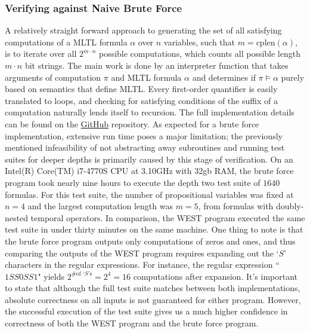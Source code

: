 \documentclass[runningheads]{llncs}
\begin{document}
\subsubsection{Verifying against Naive Brute Force}
 A relatively straight forward approach to generating the set of all satisfying computations of a MLTL formula $\alpha$ over $n$ variables, such that $m = \text{cplen}(\alpha)$, is to iterate over all $2^{m \cdot n}$ possible computations, which counts all possible length $m \cdot n$ bit strings. 
The main work is done by an interpreter function that takes arguments of computation $\pi$ and MLTL formula $\alpha$ and determines if $\pi \vDash \alpha$ purely based on semantics that define MLTL.
Every first-order quantifier is easily translated to loops, and checking for satisfying conditions of the suffix of a computation naturally lends itself to recursion.
The full implementation details can be found on the \href{https://github.com/zwang271/2022-Iowa-State-REU-Temporal-Logic-.git}{GitHub} repository. 
As expected for a brute force implementation, extensive run time poses a major limitation; the previously mentioned infeasibility of not abstracting away subroutines and running test suites for deeper depths is primarily caused by this stage of verification. 
On an Intel(R) Core(TM) i7-4770S CPU at 3.10GHz with 32gb RAM, the brute force program took nearly nine hours to execute the depth two test suite of $1640$ formulas. 
For this test suite, the number of propositional variables was fixed at $n = 4$ and the largest computation length was $m = 5$, from formulas with doubly-nested temporal operators. 
In comparison, the WEST program executed the same test suite in under thirty minutes on the same machine. One thing to note is that the brute force program outputs only computations of zeros and ones, and thus comparing the outputs of the WEST program requires expanding out the `$S$' characters in the regular expressions. For instance, the regular expression ``$1SS0SS1$" yields $2^{\text{\# of `$S$'s}} = 2^4 = 16$ computations after expansion.
It's important to state that although the full test suite matches between both implementations, absolute correctness on all inputs is not guaranteed for either program. However, the successful execution of the test suite gives us a much higher confidence in correctness of both the WEST program and the brute force program. 
\end{document}
